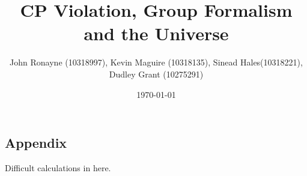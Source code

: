 \documentclass[floatfix,aps,prd,amsmath,amssymb]{revtex4}
\begin{document}
\title{CP Violation, Group Formalism and the Universe}
\author{John Ronayne (10318997), Kevin Maguire (10318135), Sinead Hales(10318221), Dudley Grant (10275291)}
\date{\today}

\begin{abstract}
\textit{}
\end{abstract}

\maketitle
\tableofcontents
{}


 















\begin{appendix}
\section{Appendix}
Difficult calculations in here.
\end{appendix}
 
\end{document}
